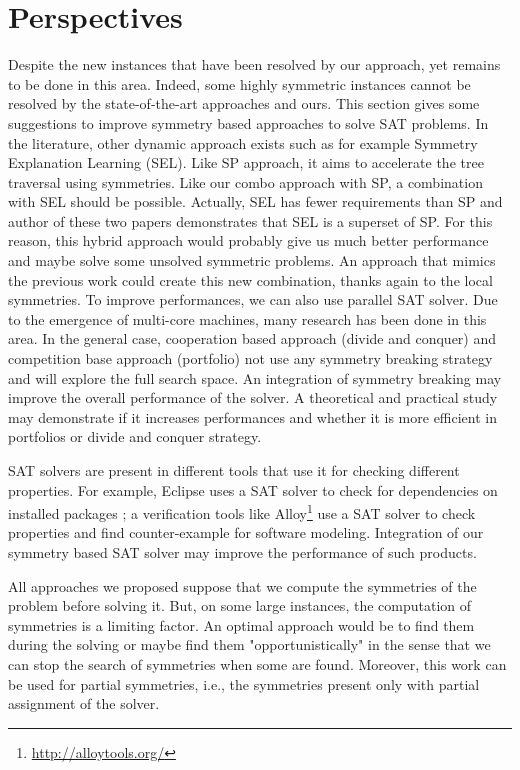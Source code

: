 \section{Perspectives}
Despite the new instances that have been resolved by our approach, yet remains to be done in this area.
Indeed, some highly symmetric instances cannot be resolved by the state-of-the-art approaches and ours.
This section gives some suggestions to improve symmetry based approaches to solve SAT problems.
In the literature, other dynamic approach exists such as for example Symmetry Explanation Learning (SEL)\cite{devriendt2017symmetric}. Like SP approach, it aims to accelerate the tree traversal using symmetries.
Like our combo approach with SP, a combination with SEL should be possible.
Actually, SEL has fewer requirements than SP and author of these two papers demonstrates that
SEL is a superset of SP. For this reason, this hybrid approach would probably give us much better performance and 
maybe solve some unsolved symmetric problems.
An approach that mimics the previous work could create this new combination, thanks again to the local symmetries.
To improve performances, we can also use parallel SAT solver. Due to the emergence of multi-core machines,
many research has been done in this area. In the general case, cooperation based approach (divide and conquer) and
competition base approach (portfolio)  not use any symmetry breaking strategy and will explore the full search space.
An integration of symmetry breaking may improve the overall performance of the solver.
A theoretical and practical study may demonstrate if it increases performances and whether it is more efficient in 
portfolios or divide and conquer strategy.

SAT solvers are present in different tools that use it for checking different properties. For example, 
 Eclipse uses a SAT solver to check for dependencies on installed packages \cite{le2008sat};
a verification tools like Alloy\footnote{\url{http://alloytools.org/}} use a SAT solver to check properties and find
counter-example for software modeling. Integration of our symmetry based SAT solver may improve the performance of such products.

All approaches we proposed suppose that we compute the symmetries of the problem before solving it.
But, on some large instances, the computation of symmetries is a limiting factor. An optimal approach
would be to find them during the solving or maybe find them "opportunistically" in the sense that we can stop the search of symmetries when some are found.
Moreover, this work can be used for partial symmetries, i.e., 
the symmetries present only with partial assignment of the solver.



 
